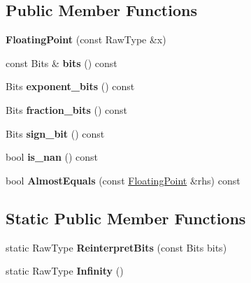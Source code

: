 \subsection*{Public Member Functions}
\begin{DoxyCompactItemize}
\item 
\mbox{\label{classtesting_1_1internal_1_1FloatingPoint_a0dabf840863e0df84046f171c891fe71}} 
{\bfseries Floating\+Point} (const Raw\+Type \&x)
\item 
\mbox{\label{classtesting_1_1internal_1_1FloatingPoint_aab053be914bdc9e507c0db89740c318c}} 
const Bits \& {\bfseries bits} () const
\item 
\mbox{\label{classtesting_1_1internal_1_1FloatingPoint_af6bf8fab8df572ecb137a3516ff390ae}} 
Bits {\bfseries exponent\+\_\+bits} () const
\item 
\mbox{\label{classtesting_1_1internal_1_1FloatingPoint_aa17337e50a2ac855719bc0676529558f}} 
Bits {\bfseries fraction\+\_\+bits} () const
\item 
\mbox{\label{classtesting_1_1internal_1_1FloatingPoint_afb8a816bb598225d775caaf43a893ef0}} 
Bits {\bfseries sign\+\_\+bit} () const
\item 
\mbox{\label{classtesting_1_1internal_1_1FloatingPoint_a1fc654fd206efa98e480aa1e034f30d5}} 
bool {\bfseries is\+\_\+nan} () const
\item 
\mbox{\label{classtesting_1_1internal_1_1FloatingPoint_a965214c1af2f9ac5adb1393794aa81e5}} 
bool {\bfseries Almost\+Equals} (const \mbox{\hyperlink{classtesting_1_1internal_1_1FloatingPoint}{Floating\+Point}} \&rhs) const
\end{DoxyCompactItemize}
\subsection*{Static Public Member Functions}
\begin{DoxyCompactItemize}
\item 
\mbox{\label{classtesting_1_1internal_1_1FloatingPoint_ac551f793522e54fbd8a25acb79eac5b1}} 
static Raw\+Type {\bfseries Reinterpret\+Bits} (const Bits bits)
\item 
\mbox{\label{classtesting_1_1internal_1_1FloatingPoint_a460027cc19cf01ae8e09cc3796b2b575}} 
static Raw\+Type {\bfseries Infinity} ()
\end{DoxyCompactItemize}
